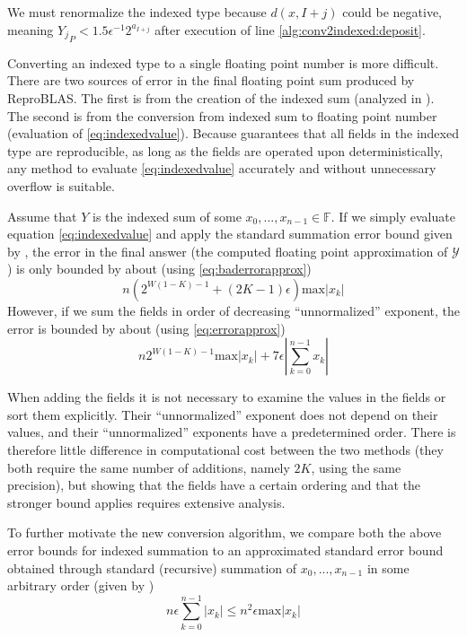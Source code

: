 \documentclass[12pt]{article}
\providecommand{\F}{\ensuremath{\mathbb{F}}}
\providecommand{\max}{\ensuremath{\text{max}}}
\theoremstyle{definition}
\numberwithin{equation}{section}
\numberwithin{figure}{section}
\begin{document}
    We must renormalize the indexed type because $d(x, I + j)$ could be negative, meaning ${Y_j}_P < 1.5  \epsilon^{-1} 2^{a_{I + j}}$ after execution of line \ref{alg:conv2indexed:deposit}.

    Converting an indexed type to a single floating point number is more difficult. There are two sources of error in the final floating point sum produced by ReproBLAS. The first is from the creation of the indexed sum (analyzed in \cite{repsum}). The second is from the conversion from indexed sum to floating point number (evaluation of  \eqref{eq:indexedvalue}).
    Because \cite{repsum} guarantees that all fields in the indexed type are reproducible, as long as the fields are operated upon deterministically, any method to evaluate  \eqref{eq:indexedvalue} accurately and without unnecessary overflow is suitable.

    Assume that $Y$ is the indexed sum of some $x_0, ..., x_{n - 1} \in \F$. If we simply evaluate equation \eqref{eq:indexedvalue} and apply the standard summation error bound given by \cite{higham}, the error in the final answer (the computed floating point approximation of $\mathcal{Y}$) is only bounded by about (using  \eqref{eq:baderrorapprox})
    \begin{equation}
      n (2^{W  (1 - K) - 1} + (2  K - 1)  \epsilon)\max|x_k|
      \label{eq:baderrorapproxdup}
    \end{equation}
    However, if we sum the fields in order of decreasing ``unnormalized'' exponent, the error is bounded by about (using  \eqref{eq:errorapprox})
    \begin{equation}
      n 2^{W  (1 - K) - 1}\max|x_k|  + 7 \epsilon |\sum\limits_{k = 0}^{n - 1} x_k|
      \label{eq:errorapproxdup}
    \end{equation}

    When adding the fields it is not necessary to examine the values in the fields or sort them explicitly. Their ``unnormalized'' exponent does not depend on their values, and their ``unnormalized'' exponents have a predetermined order. There is therefore little difference in computational cost between the two methods (they both require the same number of additions, namely $2  K$, using the same precision), but showing that the fields have a certain ordering and that the stronger bound applies requires extensive analysis.

    To further motivate the new conversion algorithm, we compare both the above error bounds for indexed summation to an approximated standard error bound obtained through standard (recursive) summation of $x_0, ..., x_{n - 1}$ in some arbitrary order (given by \cite{higham})
    \begin{equation}
      n  \epsilon  \sum\limits_{k = 0}^{n - 1}|x_k| \leq n^2  \epsilon  \max|x_k|
      \label{eq:naiveerrorapproxdup}
    \end{equation}
\end{document}
